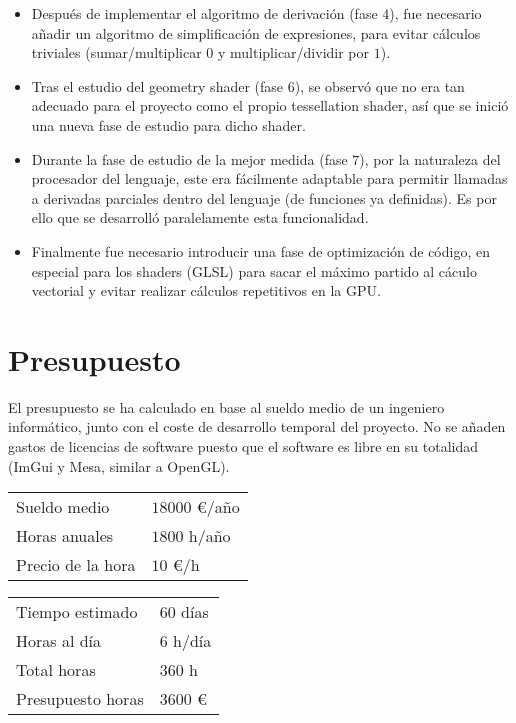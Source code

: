 \begin{itemize}
	\item Después de implementar el algoritmo de derivación (fase $4$), fue necesario añadir un algoritmo de simplificación de expresiones, para evitar cálculos triviales (sumar/multiplicar $0$ y multiplicar/dividir por $1$).
	\item Tras el estudio del geometry shader (fase $6$), se observó que no era tan adecuado para el proyecto como el propio tessellation shader, así que se inició una nueva fase de estudio para dicho shader.
	\item Durante la fase de estudio de la mejor medida (fase $7$), por la naturaleza del procesador del lenguaje, este era fácilmente adaptable para permitir llamadas a derivadas parciales dentro del lenguaje (de funciones ya definidas). Es por ello que se desarrolló paralelamente esta funcionalidad.
	\item Finalmente fue necesario introducir una fase de optimización de código, en especial para los shaders (GLSL) para sacar el máximo partido al cáculo vectorial y evitar realizar cálculos repetitivos en la GPU.
\end{itemize}

\section{Presupuesto}

El presupuesto se ha calculado en base al sueldo medio de un ingeniero informático, junto con el coste de desarrollo temporal del proyecto. No se añaden gastos de licencias de software puesto que el software es libre en su totalidad (ImGui y Mesa, similar a OpenGL).\\

\begin{tabular}{| p{4cm} | p{2.2cm} |}
\hline
Sueldo medio & $18000$ €/año\\
Horas anuales & $1800$ h/año\\
\hline
Precio de la hora & $10$ €/h\\
\hline
\end{tabular}
\quad
\begin{tabular}{| p{4cm} | p{1.5cm} |}
\hline
Tiempo estimado & $60$ días\\
Horas al día & $6$ h/día\\
Total horas & $360$ h\\
\hline
Presupuesto horas & $3600$ €\\
\hline
\end{tabular}

